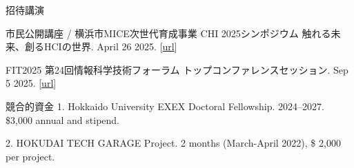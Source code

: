 \documentclass[
	11pt, %
]{resume} %
\begin{document}
\begin{rSection}{招待講演}{}{}{}
	\item 市民公開講座 / 横浜市MICE次世代育成事業 CHI 2025シンポジウム 触れる未来、創るHCIの世界. April 26 2025. [\href{https://sigchi.jp/symposium/chi2025_symposium/}{url}]
	\item FIT2025 第24回情報科学技術フォーラム トップコンファレンスセッション. Sep 5 2025. [\href{https://www.gakkai-web.net/fit/program_web/data/html/event/TCS6-1.html}{url}]
\end{rSection}

\begin{rSection}{競合的資金}
1. Hokkaido University EXEX Doctoral Fellowship. 2024--2027. \$3,000 annual and stipend.

2. HOKUDAI TECH GARAGE Project. 2 months (March-April 2022), \$ 2,000 per project.
\end{rSection}
\end{document}
